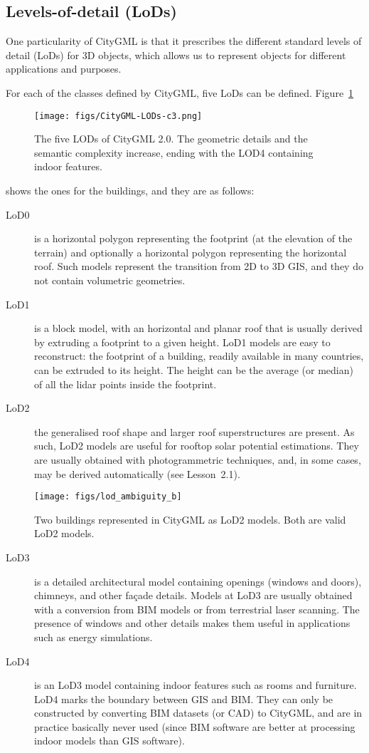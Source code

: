 %

\subsection{Levels-of-detail (LoDs)} 

One particularity of CityGML is that it prescribes the different standard levels of detail (LoDs) for 3D objects, which allows us to represent objects for different applications and purposes.

For each of the classes defined by CityGML, five LoDs can be defined.
Figure~\ref{fig:officiallods}
\begin{figure}[h]
  \centering
  \texttt{[image: figs/CityGML-LODs-c3.png]}
  \caption{The five LODs of CityGML 2.0. The geometric details and the semantic complexity increase, ending with the LOD4 containing indoor features.}%
\label{fig:officiallods}
\end{figure}
shows the ones for the buildings, and they are as follows:
\begin{description}
  \item[LoD0] is a horizontal polygon representing the footprint (at the elevation of the terrain) and optionally a horizontal polygon representing the horizontal roof.
  Such models represent the transition from 2D to 3D GIS, and they do not contain volumetric geometries.
  \item[LoD1] is a block model, with an horizontal and planar roof that is usually derived by extruding a footprint to a given height.
  LoD1 models are easy to reconstruct: the footprint of a building, readily available in many countries, can be extruded to its height. The height can be the average (or median) of all the lidar points inside the footprint.
  \item[LoD2] the generalised roof shape and larger roof superstructures are present.
  As such, LoD2 models are useful for rooftop solar potential estimations.
  They are usually obtained with photogrammetric techniques, and, in some cases, may be derived automatically (see Lesson~2.1). 
  \begin{marginfigure}
    \centering
    \texttt{[image: figs/lod\_ambiguity\_b]}
    \caption{Two buildings represented in CityGML as LoD2 models. Both are valid LoD2 models.}%
  \label{fig:lod_ambiguity}
  \end{marginfigure}
  \item[LoD3] is a detailed architectural model containing openings (windows and doors), chimneys, and other façade details.
  Models at LoD3 are usually obtained with a conversion from BIM models or from terrestrial laser scanning.
  The presence of windows and other details makes them useful in applications such as energy simulations.
  \item[LoD4] is an LoD3 model containing indoor features such as rooms and furniture.
  LoD4 marks the boundary between GIS and BIM\@.
  They can only be constructed by converting BIM datasets (or CAD) to CityGML, and are in practice basically never used (since BIM software are better at processing indoor models than GIS software).
\end{description}

